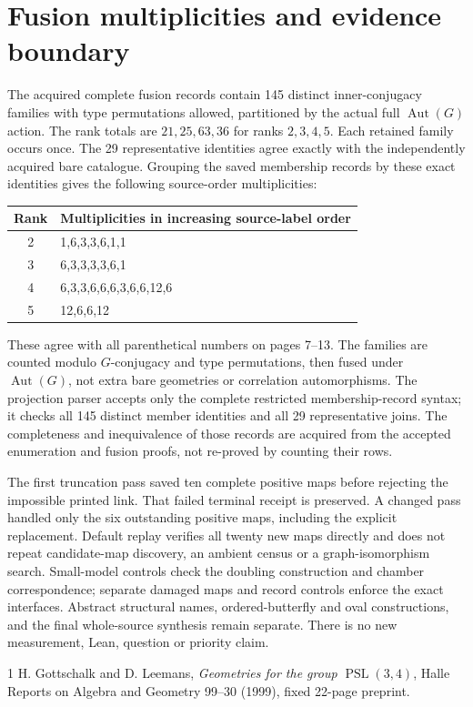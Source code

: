 \documentclass[11pt]{article}
\begin{document}
\section{Fusion multiplicities and evidence boundary}
The acquired complete fusion records contain 145 distinct inner-conjugacy
families with type permutations allowed, partitioned by the actual full
$\operatorname{Aut}(G)$ action. The rank totals are $21,25,63,36$ for
ranks $2,3,4,5$. Each retained family occurs once. The 29 representative
identities agree exactly with the independently acquired bare catalogue.
Grouping the saved membership records by these exact identities gives
the following source-order multiplicities:
\begin{center}\small
\begin{tabular}{cl}\toprule
Rank&Multiplicities in increasing source-label order\\\midrule
2&1,6,3,3,6,1,1\\
3&6,3,3,3,3,6,1\\
4&6,3,3,6,6,6,3,6,6,12,6\\
5&12,6,6,12\\\bottomrule
\end{tabular}
\end{center}
These agree with all parenthetical numbers on pages 7--13. The families
are counted modulo $G$-conjugacy and type permutations, then fused under
$\operatorname{Aut}(G)$, not extra bare geometries or correlation
automorphisms. The projection parser accepts only the complete
restricted membership-record syntax; it checks all 145 distinct
member identities and all 29 representative joins. The completeness
and inequivalence of those records are acquired from the accepted
enumeration and fusion proofs, not re-proved by counting their rows.

The first truncation pass saved ten complete positive maps before
rejecting the impossible printed link. That failed terminal receipt
is preserved. A changed pass handled only the six outstanding positive
maps, including the explicit replacement. Default replay verifies all
twenty new maps directly and does not repeat candidate-map discovery,
an ambient census or a graph-isomorphism search. Small-model controls
check the doubling construction and chamber correspondence; separate
damaged maps and record controls enforce the exact interfaces.
Abstract structural names, ordered-butterfly and oval constructions,
and the final whole-source synthesis remain separate. There is no new
measurement, Lean, question or priority claim.

\begin{thebibliography}{1}
 H. Gottschalk and D. Leemans,
\emph{Geometries for the group $\operatorname{PSL}(3,4)$},
Halle Reports on Algebra and Geometry 99--30 (1999), fixed 22-page preprint.
\end{thebibliography}
\end{document}
